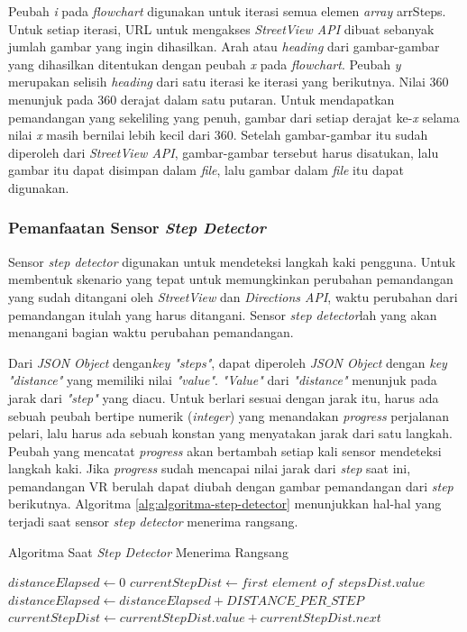 Peubah \textit{i} pada \textit{flowchart} digunakan untuk iterasi semua elemen \textit{array} arrSteps. Untuk setiap iterasi, URL untuk mengakses \textit{StreetView API} dibuat sebanyak jumlah gambar yang ingin dihasilkan. Arah atau \textit{heading} dari gambar-gambar yang dihasilkan ditentukan dengan peubah \textit{x} pada \textit{flowchart}. Peubah \textit{y} merupakan selisih \textit{heading} dari satu iterasi ke iterasi yang berikutnya. Nilai 360 menunjuk pada 360 derajat dalam satu putaran. Untuk mendapatkan pemandangan yang sekeliling yang penuh, gambar dari setiap derajat ke-\textit{x} selama nilai \textit{x} masih bernilai lebih kecil dari 360. Setelah gambar-gambar  itu sudah diperoleh dari \textit{StreetView API}, gambar-gambar tersebut harus disatukan, lalu gambar itu dapat disimpan dalam \textit{file}, lalu gambar dalam \textit{file} itu dapat digunakan.


\subsubsection{Pemanfaatan Sensor \textit{Step Detector}}
Sensor \textit{step detector} digunakan untuk mendeteksi langkah kaki pengguna. Untuk membentuk skenario yang tepat untuk memungkinkan perubahan pemandangan yang sudah ditangani oleh \textit{StreetView} dan \textit{Directions API}, waktu perubahan dari pemandangan itulah yang harus ditangani. Sensor \textit{step detector}lah yang akan menangani bagian waktu perubahan pemandangan. 

Dari \textit{JSON Object} dengan\textit{key "steps"}, dapat diperoleh \textit{JSON Object} dengan \textit{key "distance"} yang memiliki  nilai \textit{"value"}. \textit{"Value"} dari \textit{"distance"} menunjuk pada jarak dari \textit{"step"} yang diacu. Untuk berlari sesuai dengan jarak itu, harus ada sebuah peubah bertipe numerik (\textit{integer}) yang menandakan \textit{progress} perjalanan pelari, lalu harus ada sebuah konstan yang menyatakan jarak dari satu langkah. Peubah yang mencatat \textit{progress} akan bertambah setiap kali sensor mendeteksi langkah kaki. Jika \textit{progress} sudah mencapai nilai jarak dari \textit{step} saat ini, pemandangan VR berulah dapat diubah dengan gambar pemandangan dari \textit{step} berikutnya. Algoritma \ref{alg:algoritma-step-detector} menunjukkan hal-hal yang terjadi saat  sensor \textit{step detector} menerima rangsang. 

\begin{algorithm}
	\caption{Algoritma Saat \textit{Step Detector} Menerima Rangsang}
	\label{alg:algoritma-step-detector}
	\begin{algorithmic}[1]
		\State $distanceElapsed \gets 0$ 
		\State $currentStepDist \gets first$ $element$ $of$ $stepsDist.value$ 
    		\State $distanceElapsed \gets distanceElapsed + DISTANCE\_PER\_STEP$
    			\State $currentStepDist \gets currentStepDist.value + currentStepDist.next$
    		\EndIf
    	\EndIf
    	\EndIf
	\EndFunction  
	\end{algorithmic}
\end{algorithm}

